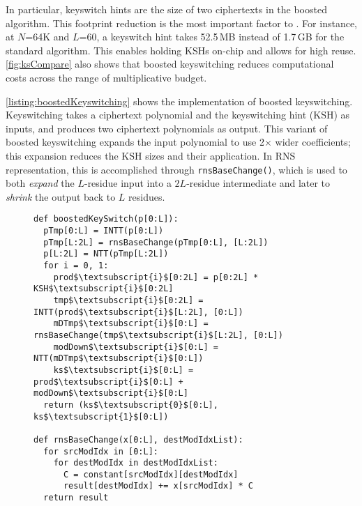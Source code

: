 In particular, keyswitch hints are the size of
two
ciphertexts in the boosted algorithm.
This footprint reduction is the most important factor to \name.
For instance, at $N$=64K and $L$=60,
a keyswitch hint takes 52.5\,MB
instead of 1.7\,GB for the standard algorithm.
This enables holding KSHs on-chip and allows for high reuse.
%
\autoref{fig:ksCompare} also shows that boosted keyswitching reduces computational
costs across the range of multiplicative budget.

\autoref{listing:boostedKeyswitching} shows the implementation of boosted keyswitching.
Keyswitching takes a ciphertext polynomial and the keyswitching hint (KSH) as inputs,
and %
produces two ciphertext polynomials as output.
This variant of boosted keyswitching expands the input polynomial to use 2$\times$ wider coefficients;
this expansion reduces the KSH sizes and their application.
In RNS representation, this is accomplished through \verb!rnsBaseChange()!,
which is used to both \emph{expand} the $L$-residue input into a $2L$-residue intermediate and later to \emph{shrink} the output
back to $L$ residues.



    \begin{figure}\label{lst:boostedKeyswitching}
      \begin{center}
          \begin{lstlisting}[caption={Boosted keyswitching implementation (1-digit).}, mathescape=true, label=listing:boostedKeyswitching]
def boostedKeySwitch(p[0:L]):
  pTmp[0:L] = INTT(p[0:L])
  pTmp[L:2L] = rnsBaseChange(pTmp[0:L], [L:2L])
  p[L:2L] = NTT(pTmp[L:2L])
  for i = 0, 1:
    prod$\textsubscript{i}$[0:2L] = p[0:2L] * KSH$\textsubscript{i}$[0:2L]
    tmp$\textsubscript{i}$[0:2L] = INTT(prod$\textsubscript{i}$[L:2L], [0:L])
    mDTmp$\textsubscript{i}$[0:L] = rnsBaseChange(tmp$\textsubscript{i}$[L:2L], [0:L])
    modDown$\textsubscript{i}$[0:L] = NTT(mDTmp$\textsubscript{i}$[0:L])
    ks$\textsubscript{i}$[0:L] = prod$\textsubscript{i}$[0:L] + modDown$\textsubscript{i}$[0:L]
  return (ks$\textsubscript{0}$[0:L], ks$\textsubscript{1}$[0:L])

def rnsBaseChange(x[0:L], destModIdxList):
  for srcModIdx in [0:L]:
    for destModIdx in destModIdxList:
      C = constant[srcModIdx][destModIdx]
      result[destModIdx] += x[srcModIdx] * C
  return result
          \end{lstlisting}
        \end{center}
	\vspace{6pt}
      \end{figure}

